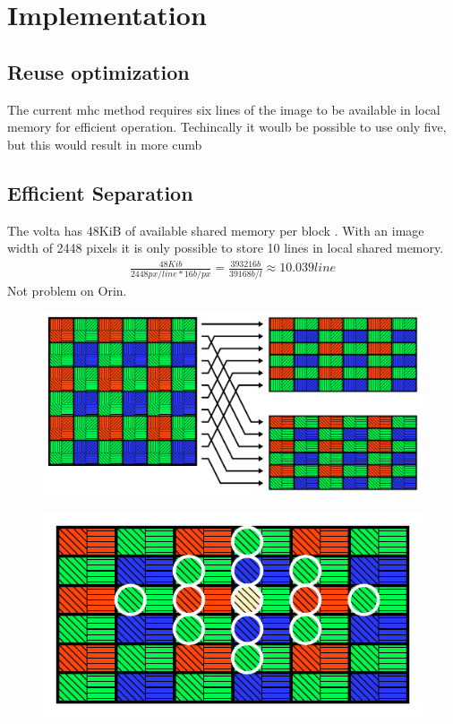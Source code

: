 \section{Implementation}


\subsection{Reuse optimization}
The current \gls{mhc} method requires six lines of the image to be available in local memory for efficient operation.
Techincally it woulb be possible to use only five, but this would result in more cumb

\subsection{Efficient Separation}
The \gls{volta} has 48KiB of available shared memory per block \cite{rigerunNVIDIAJetsonXavier2023}.
With an image width of 2448 pixels \cite{lucidvisionlabsTriton0MPPolarization} it is only possible to store 10 lines in local shared memory.
\begin{align}
    \frac{48Kib}{2448px/line * 16b/px} = \frac{393216b}{39168b/l} \approx 10.039line
\end{align}
Not problem on Orin.


\begin{figure}[H]
    \centering
    \includegraphics[width=\textwidth]{figures/polarized_image/separation.pdf}
\end{figure}

\begin{figure}[H]
    \centering
    \includegraphics[width=.6\textwidth]{figures/polarized_image/separated_conv.pdf}
\end{figure}




